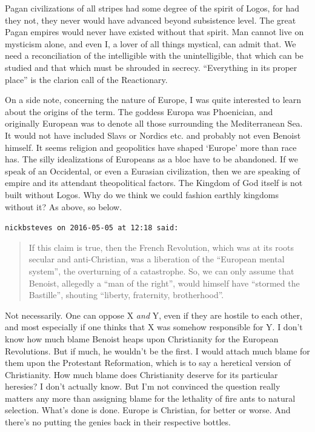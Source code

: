 \begin{footnotesize}
\begin{sffamily}
Pagan civilizations of all stripes had some degree of the spirit of Logos, for had they not, they never would have advanced beyond subsistence level. The great Pagan empires would never have existed without that spirit. Man cannot live on mysticism alone, and even I, a lover of all things mystical, can admit that. We need a reconciliation of the intelligible with the unintelligible, that which can be studied and that which must be shrouded in secrecy. ``Everything in its proper place'' is the clarion call of the Reactionary.

On a side note, concerning the nature of Europe, I was quite interested to learn about the origins of the term. The goddess Europa was Phoenician, and originally European was to denote all those surrounding the Mediterranean Sea. It would not have included Slavs or Nordics etc. and probably not even Benoist himself. It seems religion and geopolitics have shaped `Europe' more than race has. The silly idealizations of Europeans as a bloc have to be abandoned. If we speak of an Occidental, or even a Eurasian civilization, then we are speaking of empire and its attendant theopolitical factors. The Kingdom of God itself is not built without Logos. Why do we think we could fashion earthly kingdoms without it? As above, so below.

\hfill

\texttt{nickbsteves on 2016-05-05 at 12:18 said:}

\begin{quote}\footnotesize

If this claim is true, then the French Revolution, which was at its roots secular and anti-Christian, was a liberation of the ``European mental system'', the overturning of a catastrophe. So, we can only assume that Benoist, allegedly a ``man of the right'', would himself have ``stormed the Bastille'', shouting ``liberty, fraternity, brotherhood''.
\end{quote}


Not necessarily. One can oppose X \emph{and} Y, even if they are hostile to each other, and most especially if one thinks that X was somehow responsible for Y. I don't know how much blame Benoist heaps upon Christianity for the European Revolutions. But if much, he wouldn't be the first. I would attach much blame for them upon the Protestant Reformation, which is to say a heretical version of Christianity. How much blame does Christianity deserve for its particular heresies? I don't actually know. But I'm not convinced the question really matters any more than assigning blame for the lethality of fire ants to natural selection. What's done is done. Europe is Christian, for better or worse. And there's no putting the genies back in their respective bottles.


\end{sffamily}
\end{footnotesize}
